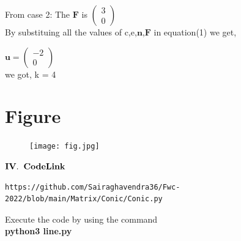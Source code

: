 \documentclass[journal,12pt,twocolumn]{IEEEtran}
\newcommand{\myvec}[1]{\ensuremath{\begin{pmatrix}#1\end{pmatrix}}}
\let\vec\mathbf
\begin{document}
From case 2: The $\vec{F}$ is $\myvec{3\\0}$\\

By substituing all the values of c,e,$\vec{n}$,$\vec{F}$ in equation(1) we get,\\

\begin{center}
$\vec{u} = \myvec{-2 \\ 0}$ \\ 
\vspace{0.2cm} we got, k = 4
\end{center}

\section{\textbf{Figure}}
\begin{figure}[h]
    \centering
\texttt{[image: fig.jpg]}
    \label{fig:my_label}
\end{figure}


\begin{center}
$\vec{IV.\hspace{.2cm} Code Link}$
\end{center}
\begin{lstlisting}
https://github.com/Sairaghavendra36/Fwc-2022/blob/main/Matrix/Conic/Conic.py
\end{lstlisting}
Execute the code by using the command\\
\textbf{python3 line.py}
\end{document}
